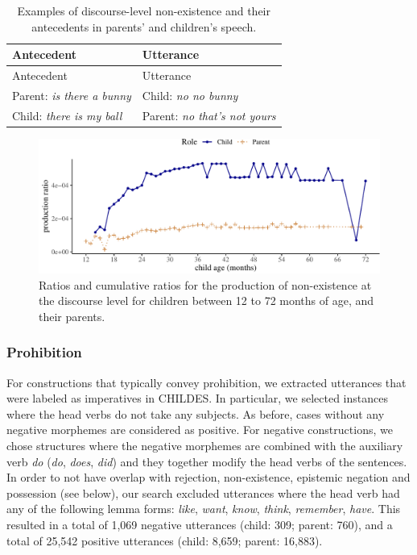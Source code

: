 \documentclass[
  english,
  man,floatsintext]{apa6}
\begin{document}
\begin{longtable}[]{@{}ll@{}}
\caption{\label{tab:disexist} Examples of discourse-level non-existence and their antecedents in parents' and children's speech.}\tabularnewline
\toprule
Antecedent & Utterance \\
\midrule
\endfirsthead
\toprule
Antecedent & Utterance \\
\midrule
\endhead
Parent: \emph{is there a bunny} & Child: \emph{no no bunny} \\
Child: \emph{there is my ball} & Parent: \emph{no that's not yours} \\
\bottomrule
\end{longtable}

\begin{figure}[H]

{\centering \includegraphics{neg_construction_article_files/figure-latex/existencediscourse-1} 

}

\caption{Ratios and cumulative ratios for the production of non-existence at the discourse level for children between 12 to 72 months of age, and their parents.}\label{fig:existencediscourse}
\end{figure}

\hypertarget{prohibition}{%
\subsubsection{Prohibition}\label{prohibition}}

For constructions that typically convey prohibition, we extracted utterances that were labeled as imperatives in CHILDES. In particular, we selected instances where the head verbs do not take any subjects. As before, cases without any negative morphemes are considered as positive. For negative constructions, we chose structures where the negative morphemes are combined with the auxiliary verb \emph{do} (\emph{do}, \emph{does}, \emph{did}) and they together modify the head verbs of the sentences. In order to not have overlap with rejection, non-existence, epistemic negation and possession (see below), our search excluded utterances where the head verb had any of the following lemma forms: \emph{like}, \emph{want}, \emph{know}, \emph{think}, \emph{remember}, \emph{have}. This resulted in a total of 1,069 negative utterances (child: 309; parent: 760), and a total of 25,542 positive utterances (child: 8,659; parent: 16,883).
\end{document}
